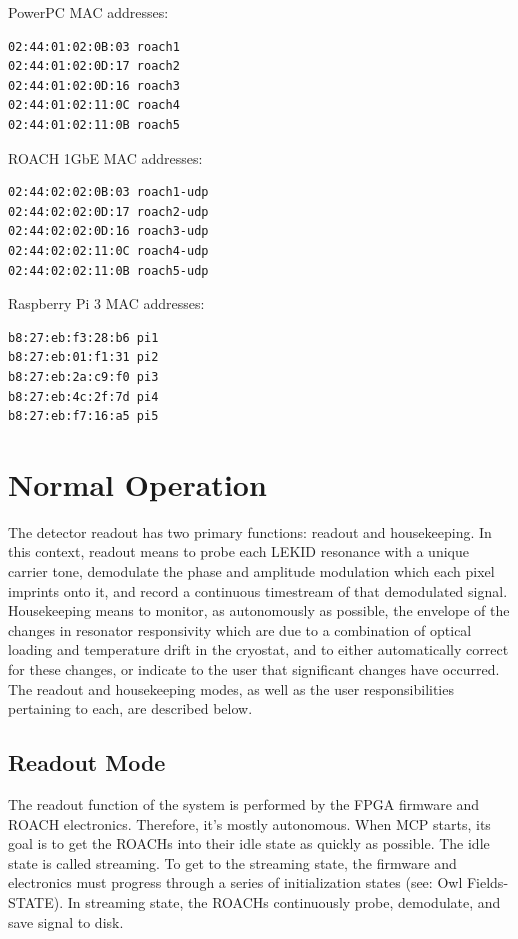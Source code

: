 PowerPC MAC addresses:
\begin{verbatim}
02:44:01:02:0B:03 roach1
02:44:01:02:0D:17 roach2
02:44:01:02:0D:16 roach3
02:44:01:02:11:0C roach4
02:44:01:02:11:0B roach5
\end{verbatim}

ROACH 1GbE MAC addresses:
\begin{verbatim}
02:44:02:02:0B:03 roach1-udp
02:44:02:02:0D:17 roach2-udp
02:44:02:02:0D:16 roach3-udp
02:44:02:02:11:0C roach4-udp
02:44:02:02:11:0B roach5-udp
\end{verbatim}

Raspberry Pi 3 MAC addresses:
\begin{verbatim}
b8:27:eb:f3:28:b6 pi1
b8:27:eb:01:f1:31 pi2
b8:27:eb:2a:c9:f0 pi3
b8:27:eb:4c:2f:7d pi4
b8:27:eb:f7:16:a5 pi5
\end{verbatim}

\section{Normal Operation}
The detector readout has two primary functions: readout and housekeeping. In this context, readout means to probe each LEKID resonance with a unique carrier tone, demodulate the phase and amplitude modulation which each pixel imprints onto it, and record a continuous timestream of that demodulated signal. Housekeeping means to monitor, as autonomously as possible, the envelope of the changes in resonator responsivity which are due to a combination of optical loading and temperature drift in the cryostat, and to either automatically correct for these changes, or indicate to the user that significant changes have occurred. The readout and housekeeping modes, as well as the user responsibilities pertaining to each, are described below.

\subsection{Readout Mode}\label{normal_mode}
The readout function of the system is performed by the FPGA firmware and ROACH electronics. Therefore, it’s mostly autonomous. When MCP starts, its goal is to get the ROACHs into their idle state as quickly as possible. The idle state is called streaming. To get to the streaming state, the firmware and electronics must progress through a series of initialization states (see: Owl Fields-STATE). In streaming state, the ROACHs continuously probe, demodulate, and save signal to disk.

